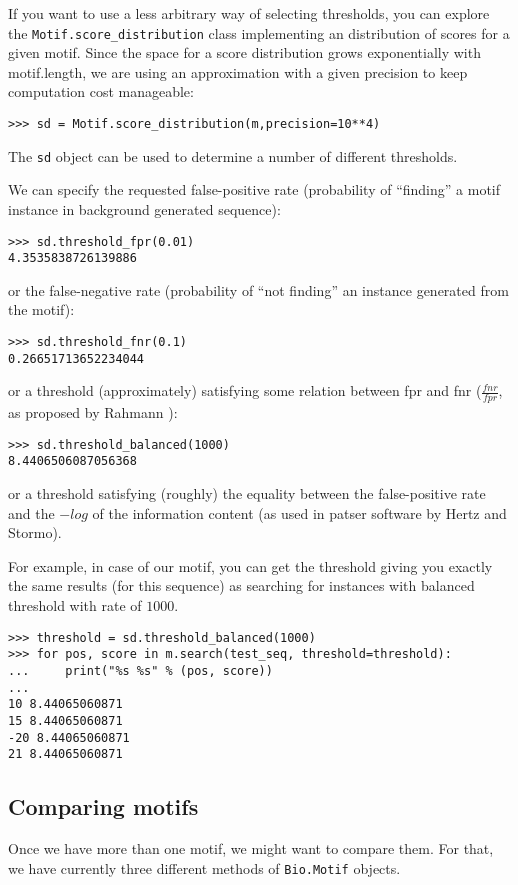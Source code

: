 \documentclass{article}
\begin{document}
If you want to use a less arbitrary way of selecting thresholds, you
can explore the \verb|Motif.score_distribution| class implementing an
distribution of scores for a given motif. Since the space for a score
distribution grows exponentially with motif.length, we are using an
approximation with a given precision to keep computation cost manageable:
\begin{verbatim}
>>> sd = Motif.score_distribution(m,precision=10**4)
\end{verbatim}
The \verb+sd+ object can be used to determine a number of different thresholds.

We can specify the requested false-positive rate (probability of ``finding'' a motif instance in background generated sequence):
\begin{verbatim}
>>> sd.threshold_fpr(0.01)
4.3535838726139886
\end{verbatim}

or the false-negative rate (probability of ``not finding'' an instance generated from the motif):
\begin{verbatim}
>>> sd.threshold_fnr(0.1)
0.26651713652234044
\end{verbatim}

or a threshold (approximately) satisfying some relation between fpr
and fnr ($\frac{fnr}{fpr}$, as proposed by Rahmann \cite{Rahmann2003}):
\begin{verbatim}
>>> sd.threshold_balanced(1000)
8.4406506087056368
\end{verbatim}

or a threshold satisfying (roughly) the equality between the
false-positive rate and the $-log$ of the information content (as used
in patser software by Hertz and Stormo).

For example, in case of our motif, you can get the threshold giving
you exactly the same results (for this sequence) as searching for
instances with balanced threshold with rate of $1000$.
\begin{verbatim}
>>> threshold = sd.threshold_balanced(1000)
>>> for pos, score in m.search(test_seq, threshold=threshold):
...     print("%s %s" % (pos, score))
... 
10 8.44065060871
15 8.44065060871
-20 8.44065060871
21 8.44065060871
\end{verbatim}

\subsection{Comparing motifs}
\label{sec:comp}
Once we have more than one motif, we might want to compare them. For
that, we have currently three different methods of \verb|Bio.Motif|
objects.
\end{document}
